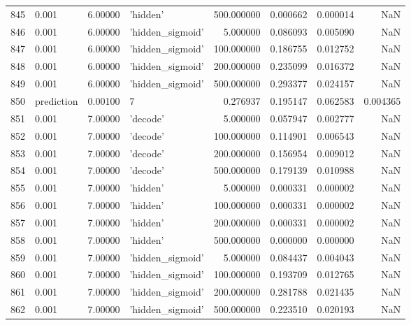 \documentclass[10pt,a4paper]{article}
\begin{document}
\begin{tabular}{llrlrrrr}
845  &       0.001 &   6.00000 &           'hidden' &  500.000000 &  0.000662 &  0.000014 &       NaN \\
846  &       0.001 &   6.00000 &   'hidden\_sigmoid' &    5.000000 &  0.086093 &  0.005090 &       NaN \\
847  &       0.001 &   6.00000 &   'hidden\_sigmoid' &  100.000000 &  0.186755 &  0.012752 &       NaN \\
848  &       0.001 &   6.00000 &   'hidden\_sigmoid' &  200.000000 &  0.235099 &  0.016372 &       NaN \\
849  &       0.001 &   6.00000 &   'hidden\_sigmoid' &  500.000000 &  0.293377 &  0.024157 &       NaN \\
850  &  prediction &   0.00100 &                  7 &    0.276937 &  0.195147 &  0.062583 &  0.004365 \\
851  &       0.001 &   7.00000 &           'decode' &    5.000000 &  0.057947 &  0.002777 &       NaN \\
852  &       0.001 &   7.00000 &           'decode' &  100.000000 &  0.114901 &  0.006543 &       NaN \\
853  &       0.001 &   7.00000 &           'decode' &  200.000000 &  0.156954 &  0.009012 &       NaN \\
854  &       0.001 &   7.00000 &           'decode' &  500.000000 &  0.179139 &  0.010988 &       NaN \\
855  &       0.001 &   7.00000 &           'hidden' &    5.000000 &  0.000331 &  0.000002 &       NaN \\
856  &       0.001 &   7.00000 &           'hidden' &  100.000000 &  0.000331 &  0.000002 &       NaN \\
857  &       0.001 &   7.00000 &           'hidden' &  200.000000 &  0.000331 &  0.000002 &       NaN \\
858  &       0.001 &   7.00000 &           'hidden' &  500.000000 &  0.000000 &  0.000000 &       NaN \\
859  &       0.001 &   7.00000 &   'hidden\_sigmoid' &    5.000000 &  0.084437 &  0.004043 &       NaN \\
860  &       0.001 &   7.00000 &   'hidden\_sigmoid' &  100.000000 &  0.193709 &  0.012765 &       NaN \\
861  &       0.001 &   7.00000 &   'hidden\_sigmoid' &  200.000000 &  0.281788 &  0.021435 &       NaN \\
862  &       0.001 &   7.00000 &   'hidden\_sigmoid' &  500.000000 &  0.223510 &  0.020193 &       NaN \\

\end{tabular}
\end{document}
